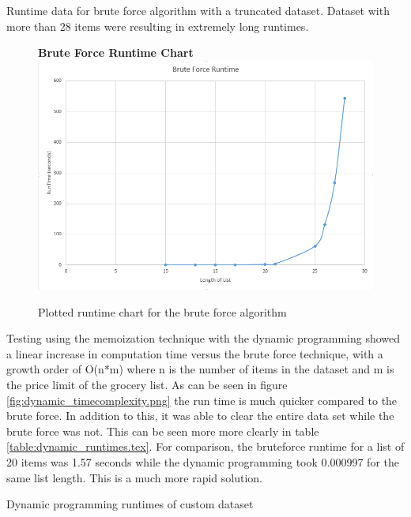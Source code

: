 \documentclass[10pt,journal,compsoc]{IEEEtran}
\begin{document}
\begin{table}[h]
    \setlength\tabcolsep{2pt}
    \centering
    
    \caption{Runtime data for brute force algorithm with a truncated dataset. Dataset with more than 28 items were resulting in extremely long runtimes.}
    \label{table:bruteforce_results.tex}
\end{table}

\begin{figure}[h]
    \centering
    \textbf{Brute Force Runtime Chart}
    \includegraphics[width=\columnwidth]{assets/bruteforce_runtime.png}
    \caption{Plotted runtime chart for the brute force algorithm}
    \label{fig:bruteforce_timecomplexity.png}
\end{figure}

Testing using the memoization technique with the dynamic programming showed a
linear increase in computation time versus the brute force technique, with a
growth order of O(n*m) where n is the number of items in the dataset and m is
the price limit of the grocery list. As can be seen in figure
\ref{fig:dynamic_timecomplexity.png} the run time is much quicker compared to
the brute force. In addition to this, it was able to clear the entire data set
while the brute force was not. This can be seen more more clearly in table
\ref{table:dynamic_runtimes.tex}. For comparison, the bruteforce runtime for a
list of 20 items was 1.57 seconds while the dynamic programming took 0.000997
for the same list length. This is a much more rapid solution.

\begin{table}[h]
    \setlength\tabcolsep{2pt}
    \centering
    
    \caption{Dynamic programming runtimes of custom dataset}
    \label{table:dynamic_runtimes.tex}
\end{table}
\end{document}
